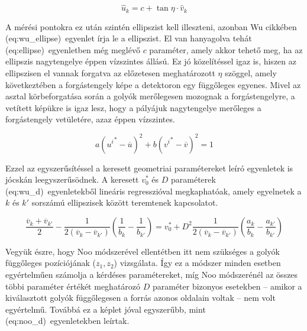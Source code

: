 \documentclass[a4paper,12pt]{article}
\begin{document}
\begin{equation}
 \label{eq:wu_eta}
\hat{u}_k  = c + \tan \eta \cdot \hat{v}_k
\end{equation}

A mérési pontokra ez után szintén ellipszist kell illeszteni, azonban Wu cikkében \aref({eq:wu_ellipse})~egyenlet írja le a ellipszist. El van hanyagolva tehát \aref({eq:ellipse})~egyenletben még meglévő $c$ paraméter, amely akkor tehető meg, ha az ellipszis nagytengelye éppen vízszintes állású. Ez jó közelítéssel igaz is, hiszen az ellipszisen el vannak forgatva az előzetesen meghatározott $\eta$ szöggel, amely következtében a forgástengely képe a detektoron egy függőleges egyenes. Mivel az asztal körbeforgatása során a golyók merőlegesen mozognak a forgástengelyre, a vetített képükre is igaz lesz, hogy a pályájuk nagytengelye merőleges a forgástengely vetületére, azaz éppen vízszintes. 

\begin{equation}
\label{eq:wu_ellipse}
a \left ( {u^i}^* - \overline{u} \right )^2 + b  \left ( {v^i}^* - \overline{v} \right )^2  = 1
\end{equation}



Ezzel az egyszerűsítéssel a keresett geometriai paramétereket leíró egyenletek is jócskán leegyszerűsödnek. A keresett $v_0^*$ és $D$ paraméterek  \aref({eq:wu_d})~egyenletekből lineáris regresszióval megkaphatóak, amely egyelnetek a $k$ és $k'$ sorszámú ellipszisek között teremtenek kapcsolatot.

\begin{equation}
\label{eq:wu_d}
\frac{\overline{v}_k + \overline{v}_{k'}}{2}  - \frac{1}{2 \left( \overline{v}_k   - \overline{v}_{k'}  \right)} \left( \frac{1}{b_k} - \frac{1}{b_{k'}} \right) = v_0^* + D^2 \frac{1}{2 \left( \overline{v}_k   - \overline{v}_{k'} \right) }   \left( \frac{a_k}{b_k} - \frac{a_{k'}}{b_{k'}} \right)
\end{equation}

Vegyük észre, hogy Noo módszerével ellentétben itt nem szükséges a golyók függőleges pozíciójának ($z_1, z_2$) vizsgálata. Így ez a módszer minden esetben egyértelműen számolja a kérdéses paramétereket, míg Noo módszerénél az összes többi paraméter értékét meghatározó $D$ paraméter bizonyos esetekben -- amikor a kiválasztott golyók függőlegesen a forrás azonos oldalain voltak -- nem volt egyértelmű. Továbbá ez a képlet jóval egyszerűbb, mint \aref({eq:noo_d})~egyenletekben leírtak.
\end{document}
